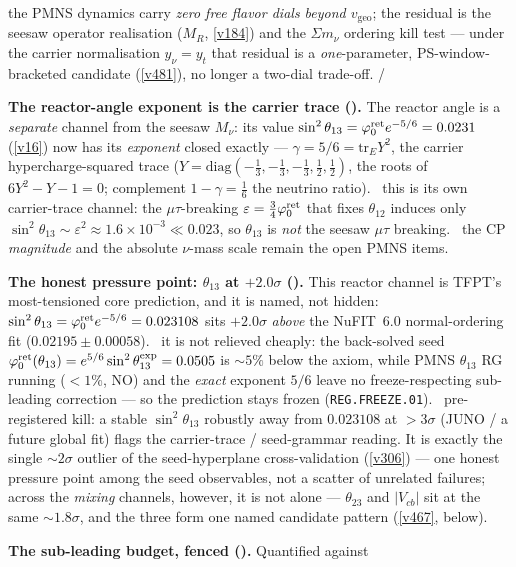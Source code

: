 the PMNS dynamics carry \emph{zero free flavor dials beyond $v_{\mathrm{geo}}$}; the residual is the seesaw
operator realisation ($M_R$, \vref{v184}) and the $\Sigma m_\nu$ ordering kill test --- under the carrier
normalisation $y_\nu{=}y_t$ that residual is a \emph{one}-parameter, PS-window-bracketed candidate
(\vref{v481}), no longer a two-dial trade-off. \mE/\mC
\par\smallskip\noindent\textbf{The reactor-angle exponent is the carrier trace ().}
The reactor angle is a \emph{separate} channel from the seesaw $M_\nu$: its value $\sin^2\theta_{13}=\varphi_0^{\mathrm{ret}}
e^{-5/6}=0.0231$ (\vref{v16}) now has its \emph{exponent} closed exactly --- $\gamma=5/6=\mathrm{tr}_E Y^2$,
the carrier hypercharge-squared trace ($Y=\mathrm{diag}(-\tfrac13,-\tfrac13,-\tfrac13,\tfrac12,\tfrac12)$,
the roots of $6Y^2-Y-1=0$; complement $1-\gamma=\tfrac16$ the neutrino ratio). \mE\ this is its own
carrier-trace channel: the $\mu\tau$-breaking $\varepsilon=\tfrac34\varphi_0^{\mathrm{ret}}$ that fixes $\theta_{12}$ induces
only $\sin^2\theta_{13}\sim\varepsilon^2\approx1.6\times10^{-3}\ll0.023$, so $\theta_{13}$ is \emph{not} the
seesaw $\mu\tau$ breaking. \mO\ the CP \emph{magnitude} and the absolute $\nu$-mass scale remain the open
PMNS items.
\par\smallskip\noindent\textbf{The honest pressure point: $\theta_{13}$ at $+2.0\sigma$ ().}
This reactor channel is TFPT's most-tensioned core prediction, and it is named, not hidden: $\sin^2\theta_{13}=\varphi_0^{\mathrm{ret}}
e^{-5/6}=0.023108$ sits $+2.0\sigma$ \emph{above} the NuFIT~6.0 normal-ordering fit ($0.02195\pm0.00058$). \mC\ it is
not relieved cheaply: the back-solved seed $\varphi_0^{\mathrm{ret}}(\theta_{13})=e^{5/6}\sin^2\theta_{13}^{\mathrm{exp}}=0.0505$ is
${\sim}5\%$ below the axiom, while PMNS $\theta_{13}$ RG running ($<1\%$, NO) and the \emph{exact} exponent $5/6$
leave no freeze-respecting sub-leading correction --- so the prediction stays frozen (\texttt{REG.FREEZE.01}).
\mX\ pre-registered kill: a stable $\sin^2\theta_{13}$ robustly away from $0.023108$ at $>3\sigma$ (JUNO / a future
global fit) flags the carrier-trace / seed-grammar reading. It is exactly the single ${\sim}2\sigma$ outlier of the
seed-hyperplane cross-validation (\vref{v306}) --- one honest pressure point among the seed observables, not a
scatter of unrelated failures; across the \emph{mixing} channels, however, it is not alone --- $\theta_{23}$ and
$|V_{cb}|$ sit at the same ${\sim}1.8\sigma$, and the three form one named candidate pattern (\vref{v467}, below).
\par\smallskip\noindent\textbf{The sub-leading budget, fenced ().} Quantified against
